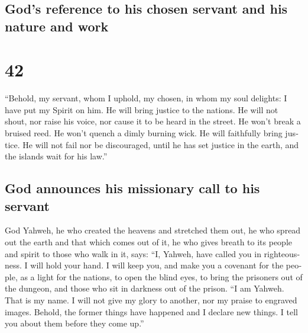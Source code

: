\begin{paracol}{2}
\switchcolumn
\begin{otherlanguage}{english}

\hypertarget{gods-reference-to-his-chosen-servant-and-his-nature-and-work}{%
\subsection{God's reference to his chosen servant and his nature and
work}\label{gods-reference-to-his-chosen-servant-and-his-nature-and-work}}

\hypertarget{section-83}{%
\section{42}\label{section-83}}

 ``Behold, my servant, whom I uphold, my chosen, in whom
my soul delights: I have put my Spirit on him. He will bring justice to
the nations.  He will not shout, nor raise his voice, nor
cause it to be heard in the street.  He won't break a
bruised reed. He won't quench a dimly burning wick. He will faithfully
bring justice.  He will not fail nor be discouraged, until
he has set justice in the earth, and the islands wait for his law.''

\hypertarget{god-announces-his-missionary-call-to-his-servant}{%
\subsection{God announces his missionary call to his
servant}\label{god-announces-his-missionary-call-to-his-servant}}

 God Yahweh, he who created the heavens and stretched them
out, he who spread out the earth and that which comes out of it, he who
gives breath to its people and spirit to those who walk in it, says:
 ``I, Yahweh, have called you in righteousness. I will
hold your hand. I will keep you, and make you a covenant for the people,
as a light for the nations,  to open the blind eyes, to
bring the prisoners out of the dungeon, and those who sit in darkness
out of the prison.  ``I am Yahweh. That is my name. I will
not give my glory to another, nor my praise to engraved images.
 Behold, the former things have happened and I declare new
things. I tell you about them before they come up.''

\hypertarget{praise-the-lord-who-brings-about-salvation-especially-the-liberation-of-his-people-gods-promise-of-his-forceful-action-despite-the-idol-worshipers}{%
}
\end{otherlanguage}
\end{paracol}

